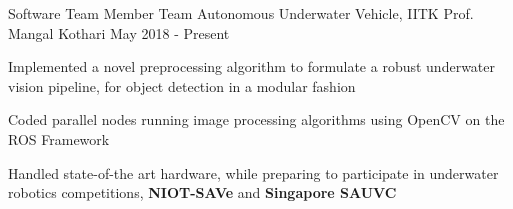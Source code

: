 
\begin{cventries}

  \cventry
    {Software Team Member}
    {Team Autonomous Underwater Vehicle, IITK}
    {Prof. Mangal Kothari}
    {May 2018 - Present}
    {
      \begin{cvitems}
        \item {Implemented a novel preprocessing algorithm to formulate a robust underwater vision pipeline, for object detection in a modular fashion}
        \item {Coded parallel nodes running image processing algorithms using OpenCV on the ROS Framework}
        \item {Handled state-of-the art hardware, while preparing to participate in underwater robotics competitions, \textbf{NIOT-SAVe} and \textbf{Singapore SAUVC} }
      \end{cvitems}
    }

\end{cventries}

